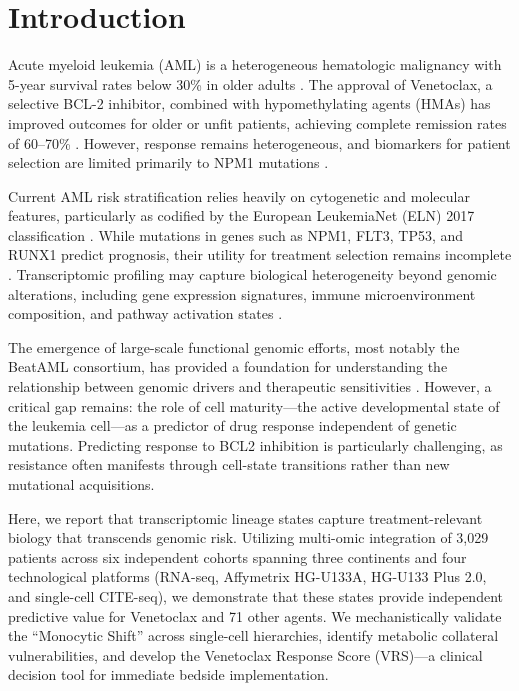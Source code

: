 \documentclass[11pt,a4paper]{article}
\begin{document}
\newpage

\section{Introduction}

Acute myeloid leukemia (AML) is a heterogeneous hematologic malignancy with 5-year survival rates below 30\% in older adults \cite{dohner2015aml}. The approval of Venetoclax, a selective BCL-2 inhibitor, combined with hypomethylating agents (HMAs) has improved outcomes for older or unfit patients, achieving complete remission rates of 60--70\% \cite{dinardo2020venetoclax,pollyea2020venetoclax}. However, response remains heterogeneous, and biomarkers for patient selection are limited primarily to NPM1 mutations \cite{morsia2020npm1}.

Current AML risk stratification relies heavily on cytogenetic and molecular features, particularly as codified by the European LeukemiaNet (ELN) 2017 classification \cite{dohner2017eln}. While mutations in genes such as NPM1, FLT3, TP53, and RUNX1 predict prognosis, their utility for treatment selection remains incomplete \cite{papaemmanuil2016genomic}. Transcriptomic profiling may capture biological heterogeneity beyond genomic alterations, including gene expression signatures, immune microenvironment composition, and pathway activation states \cite{cancer2013tcga}.

The emergence of large-scale functional genomic efforts, most notably the BeatAML consortium, has provided a foundation for understanding the relationship between genomic drivers and therapeutic sensitivities \cite{tyner2018beataml}. However, a critical gap remains: the role of cell maturity—the active developmental state of the leukemia cell—as a predictor of drug response independent of genetic mutations. Predicting response to BCL2 inhibition is particularly challenging, as resistance often manifests through cell-state transitions rather than new mutational acquisitions.

Here, we report that transcriptomic lineage states capture treatment-relevant biology that transcends genomic risk. Utilizing multi-omic integration of 3,029 patients across six independent cohorts spanning three continents and four technological platforms (RNA-seq, Affymetrix HG-U133A, HG-U133 Plus 2.0, and single-cell CITE-seq), we demonstrate that these states provide independent predictive value for Venetoclax and 71 other agents. We mechanistically validate the ``Monocytic Shift'' across single-cell hierarchies, identify metabolic collateral vulnerabilities, and develop the Venetoclax Response Score (VRS)---a clinical decision tool for immediate bedside implementation.
\end{document}
